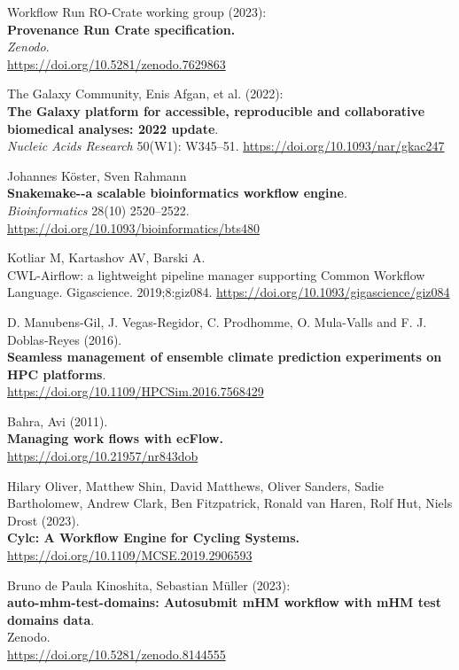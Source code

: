 \documentclass[10pt,letterpaper]{article}
\begin{document}
\begin{thebibliography}{10}
 Workflow Run RO-Crate
working group (2023):\\
\textbf{Provenance Run Crate specification.}\\
\emph{Zenodo}.\\
\url{https://doi.org/10.5281/zenodo.7629863}

The Galaxy Community, Enis Afgan, et al. (2022):\\
\textbf{The Galaxy platform for accessible, reproducible and
collaborative biomedical analyses: 2022 update}.\\
\emph{Nucleic Acids Research} 50(W1): W345--51.
\url{https://doi.org/10.1093/nar/gkac247}

Johannes Köster, Sven Rahmann \\
\textbf{Snakemake-\/-a scalable bioinformatics workflow engine}.\\
\emph{Bioinformatics} 28(10) 2520--2522.\\
\url{https://doi.org/10.1093/bioinformatics/bts480}

Kotliar M, Kartashov AV, Barski A. \\
CWL-Airflow: a lightweight pipeline manager supporting Common Workflow Language. Gigascience. 2019;8:giz084.
\url{https://doi.org/10.1093/gigascience/giz084}

 D. Manubens-Gil, J. Vegas-Regidor, C. Prodhomme,
O. Mula-Valls and F. J. Doblas-Reyes (2016).\\
\textbf{Seamless management of ensemble climate prediction experiments
on HPC platforms}.\\
\url{https://doi.org/10.1109/HPCSim.2016.7568429}

 Bahra, Avi (2011).\\
\textbf{Managing work flows with ecFlow.}\\
\url{https://doi.org/10.21957/nr843dob}

 Hilary Oliver, Matthew Shin, David Matthews, Oliver Sanders, Sadie Bartholomew, Andrew Clark, Ben Fitzpatrick, Ronald van Haren, Rolf Hut, Niels Drost
(2023).\\
\textbf{Cylc: A Workflow Engine for Cycling Systems.}\\
\url{https://doi.org/10.1109/MCSE.2019.2906593}

 Bruno de Paula Kinoshita, Sebastian Müller
(2023):\\
\textbf{auto-mhm-test-domains: Autosubmit mHM workflow with mHM test
domains data}.\\
Zenodo.\\
\url{https://doi.org/10.5281/zenodo.8144555}


\end{thebibliography}
\end{document}
